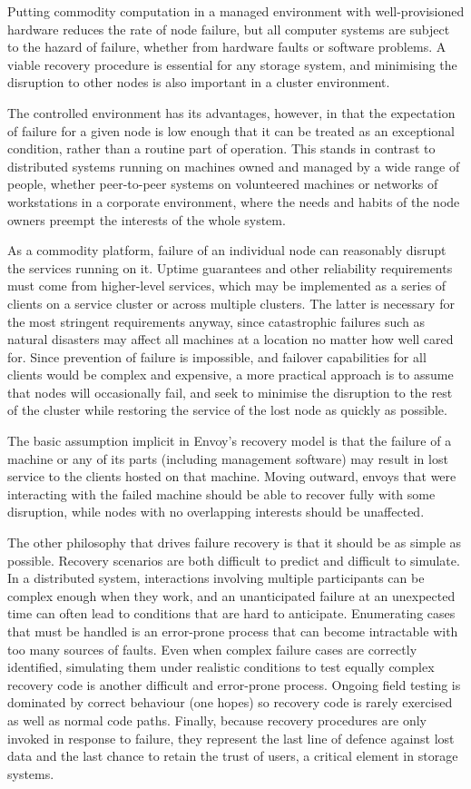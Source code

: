 Putting commodity computation in a managed environment with well-provisioned hardware reduces the rate of node failure, but all computer systems are subject to the hazard of failure, whether from hardware faults or software problems. A viable recovery procedure is essential for any storage system, and minimising the disruption to other nodes is also important in a cluster environment.

The controlled environment has its advantages, however, in that the expectation of failure for a given node is low enough that it can be treated as an exceptional condition, rather than a routine part of operation. This stands in contrast to distributed systems running on machines owned and managed by a wide range of people, whether peer-to-peer systems on volunteered machines or networks of workstations in a corporate environment, where the needs and habits of the node owners preempt the interests of the whole system.

As a commodity platform, failure of an individual node can reasonably disrupt the services running on it. Uptime guarantees and other reliability requirements must come from higher-level services, which may be implemented as a series of clients on a service cluster or across multiple clusters. The latter is necessary for the most stringent requirements anyway, since catastrophic failures such as natural disasters may affect all machines at a location no matter how well cared for. Since prevention of failure is impossible, and failover capabilities for all clients would be complex and expensive, a more practical approach is to assume that nodes will occasionally fail, and seek to minimise the disruption to the rest of the cluster while restoring the service of the lost node as quickly as possible.

The basic assumption implicit in Envoy's recovery model is that the failure of a machine or any of its parts (including management software) may result in lost service to the clients hosted on that machine. Moving outward, envoys that were interacting with the failed machine should be able to recover fully with some disruption, while nodes with no overlapping interests should be unaffected.

The other philosophy that drives failure recovery is that it should be as simple as possible. Recovery scenarios are both difficult to predict and difficult to simulate. In a distributed system, interactions involving multiple participants can be complex enough when they work, and an unanticipated failure at an unexpected time can often lead to conditions that are hard to anticipate. Enumerating cases that must be handled is an error-prone process that can become intractable with too many sources of faults. Even when complex failure cases are correctly identified, simulating them under realistic conditions to test equally complex recovery code is another difficult and error-prone process. Ongoing field testing is dominated by correct behaviour (one hopes) so recovery code is rarely exercised as well as normal code paths. Finally, because recovery procedures are only invoked in response to failure, they represent the last line of defence against lost data and the last chance to retain the trust of users, a critical element in storage systems.


